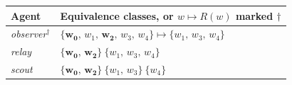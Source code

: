 \begin{tabular}{@{}ll@{}}
\toprule
\textbf{Agent} & \textbf{Equivalence classes, or $w \mapsto R(w)$ marked }$\dagger$ \\
\midrule
\textit{observer}$^{\dagger}$ & $\{\mathbf{w_{0}},\,w_{1},\,\mathbf{w_{2}},\,w_{3},\,w_{4}\} \mapsto \{w_{1},\,w_{3},\,w_{4}\}$ \\
\textit{relay} & $\{\mathbf{w_{0}},\,\mathbf{w_{2}}\}\ \{w_{1},\,w_{3},\,w_{4}\}$ \\
\textit{scout} & $\{\mathbf{w_{0}},\,\mathbf{w_{2}}\}\ \{w_{1},\,w_{3}\}\ \{w_{4}\}$ \\
\bottomrule
\end{tabular}
